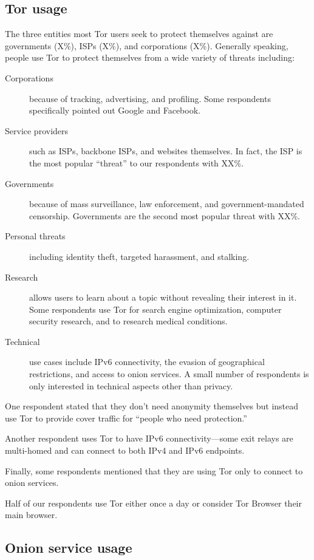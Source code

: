 \subsection{Tor usage}
The three entities most Tor users seek to protect themselves against are
governments (X\%), ISPs (X\%), and corporations (X\%).  Generally speaking,
people use Tor to protect themselves from a wide variety of threats including:
\begin{description}
    \item[Corporations] because of tracking, advertising, and profiling.  Some
        respondents specifically pointed out Google and Facebook.
    \item[Service providers] such as ISPs, backbone ISPs, and websites
        themselves.  In fact, the ISP is the most popular ``threat'' to our
        respondents with XX\%.
    \item[Governments] because of mass surveillance, law enforcement, and
        government-mandated censorship.  Governments are the second most
        popular threat with XX\%.
    \item[Personal threats] including identity theft, targeted harassment, and
        stalking.
    \item[Research] allows users to learn about a topic without revealing their
        interest in it.  Some respondents use Tor for search engine
        optimization, computer security research, and to research medical
        conditions.
    \item[Technical] use cases include IPv6 connectivity, the evasion of
        geographical restrictions, and access to onion services.  A small
        number of respondents is only interested in technical aspects other
        than privacy.
\end{description}

One respondent stated that they don't need anonymity themselves but instead use
Tor to provide cover traffic for ``people who need protection.''

Another respondent uses Tor to have IPv6 connectivity---some exit relays are
multi-homed and can connect to both IPv4 and IPv6 endpoints.

Finally, some respondents mentioned that they are using Tor only to connect to
onion services.

Half of our respondents use Tor either once a day or consider Tor Browser their
main browser.

\subsection{Onion service usage}


